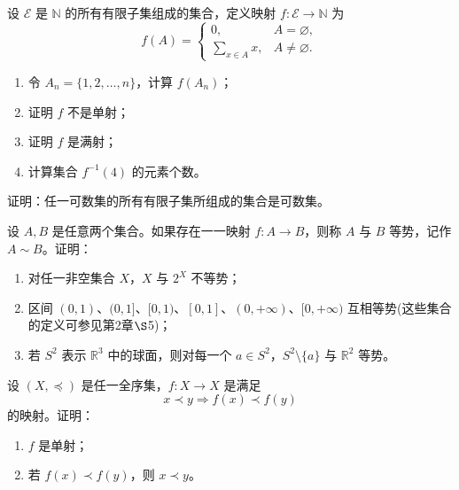 \begin{exercise}
  \item 设 \(\mathscr{E}\) 是 \(\mathbb{N}\) 的所有有限子集组成的集合，定义映射 \(f:\mathscr{E}\to\mathbb{N}\) 为
  \[
  f(A)=
  \begin{cases}
    0,&A=\varnothing,\\
    \displaystyle\sum_{x\in A}x,&A\ne\varnothing.
  \end{cases}
  \]
  \begin{enumerate}[label=\arabic*)]
    \item 令 \(A_n=\{1,2,\ldots,n\}\)，计算 \(f(A_n)\)；
    \item 证明 \(f\) 不是单射；
    \item 证明 \(f\) 是满射；
    \item 计算集合 \(f^{-1}(4)\) 的元素个数。
  \end{enumerate}
\end{exercise}

\begin{exercise}
  \item 证明：任一可数集的所有有限子集所组成的集合是可数集。
\end{exercise}

\begin{exercise}
  \item 设 \(A,B\) 是任意两个集合。如果存在一一映射 \(f:A\to B\)，则称 \(A\) 与 \(B\) 等势，记作 \(A\sim B\)。证明：
  \begin{enumerate}[label=\arabic*)]
    \item 对任一非空集合 \(X\)，\(X\) 与 \(2^X\) 不等势；
    \item 区间 \((0,1)\)、\((0,1]\)、\([0,1)\)、\([0,1]\)、\((0,+\infty)\)、\([0,+\infty)\) 互相等势(这些集合的定义可参见第2章$\S$5)；
    \item 若 \(S^2\) 表示 \(\mathbb{R}^3\) 中的球面，则对每一个 \(a\in S^2\)，\(S^2\setminus\{a\}\) 与 \(\mathbb{R}^2\) 等势。
  \end{enumerate}
\end{exercise}

\begin{exercise}
  \item 设 \((X,\preceq)\) 是任一全序集，\(f:X\to X\) 是满足
  \[
  x\prec y\Longrightarrow f(x)\prec f(y)
  \]
  的映射。证明：
  \begin{enumerate}[label=\arabic*)]
    \item \(f\) 是单射；
    \item 若 \(f(x)\prec f(y)\)，则 \(x\prec y\)。
  \end{enumerate}
\end{exercise}

